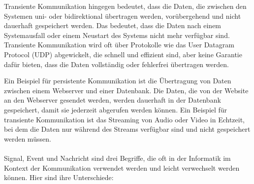 Transiente Kommunikation hingegen bedeutet, dass die Daten, die zwischen den Systemen uni- oder bidirektional übertragen werden, vorübergehend und nicht dauerhaft gespeichert werden. Das bedeutet, dass die Daten nach einem Systemausfall oder einem Neustart des Systems nicht mehr verfügbar sind. Transiente Kommunikation wird oft über Protokolle wie das User Datagram Protocol (UDP) abgewickelt, die schnell und effizient sind, aber keine Garantie dafür bieten, dass die Daten vollständig oder fehlerfrei übertragen werden.

Ein Beispiel für persistente Kommunikation ist die Übertragung von Daten zwischen einem Webserver und einer Datenbank. Die Daten, die von der Website an den Webserver gesendet werden, werden dauerhaft in der Datenbank gespeichert, damit sie jederzeit abgerufen werden können. Ein Beispiel für transiente Kommunikation ist das Streaming von Audio oder Video in Echtzeit, bei dem die Daten nur während des Streams verfügbar sind und nicht gespeichert werden müssen.
\\\\
Signal, Event und Nachricht sind drei Begriffe, die oft in der Informatik im Kontext der Kommunikation verwendet werden und leicht verwechselt werden können. Hier sind ihre Unterschiede:

